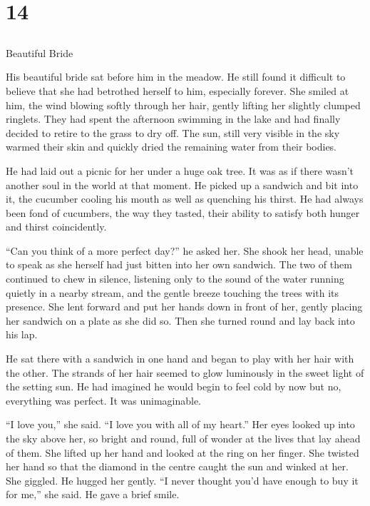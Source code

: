 \chapter{14}
\section{}
Beautiful Bride  

His beautiful bride sat before him in the meadow.  He still found it difficult to believe that she had betrothed herself to him, especially forever.  She smiled at him, the wind blowing softly through her hair, gently lifting her slightly clumped ringlets.  They had spent the afternoon swimming in the lake and had finally decided to retire to the grass to dry off.  The sun, still very visible in the sky warmed their skin and quickly dried the remaining water from their bodies.  

He had laid out a picnic for her under a huge oak tree.  It was as if there wasn't another soul in the world at that moment.  He picked up a sandwich and bit into it, the cucumber cooling his mouth as well as quenching his thirst.  He had always been fond of cucumbers, the way they tasted, their ability to satisfy both hunger and thirst coincidently.

``Can you think of a more perfect day?'' he asked her.  She shook her head, unable to speak as she herself had just bitten into her own sandwich.  The two of them continued to chew in silence, listening only to the sound of the water running quietly in a nearby stream, and the gentle breeze touching the trees with its presence.  She lent forward and put her hands down in front of her, gently placing her sandwich on a plate as she did so.  Then she turned  round and lay back into his lap.

He sat there with a sandwich in one hand and began to play with her hair with the other.  The strands of her hair seemed to glow luminously in the sweet light of the setting sun.  He had imagined he would begin to feel cold by now but no, everything was perfect.  It was unimaginable.

``I love you,'' she said.  ``I love you with all of my heart.''  Her eyes looked up into the sky above her, so bright and round, full of wonder at the lives that lay ahead of them.  She lifted up her hand and looked at the ring on her finger.  She twisted her hand so that the diamond in the centre caught the sun and winked at her.  She giggled.  He hugged her gently.  ``I never thought you'd have enough to buy it for me,'' she said.  He gave a brief smile.

